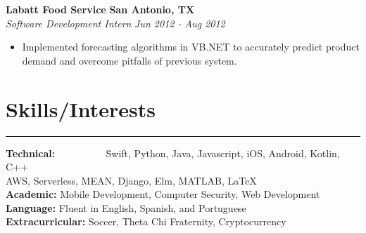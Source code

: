 \documentclass{res}
\begin{document}
\begin{resume}
{\bf Labatt Food Service} \hfill {\bf San Antonio, TX} \\
{\textit {Software Development Intern}} \hfill {\textit {Jun 2012 - Aug 2012}} 
\begin{itemize}
\renewcommand{\labelitemi}{\ding{117}}
\itemsep -2pt  
\item Implemented forecasting algorithms in VB.NET to accurately predict product demand
	and overcome pitfalls of previous system.
\end{itemize}

\vspace{-9pt}

\section{{\large Skills/Interests}}

\vspace{-10pt}

\noindent\rule{\resumewidth}{0.4pt}  
\vspace{-30pt}
\begin{tabbing}
{\bf Technical: } ~~~~~~~~~ \= Swift, Python, Java, Javascript, iOS, Android, Kotlin, C++ \\
\> AWS, Serverless, MEAN, Django, Elm, MATLAB, \LaTeX \\
{\bf Academic: } \>  Mobile Development, Computer Security, Web Development \\
{\bf Language: } \> Fluent in English, Spanish, and Portuguese\\
{\bf Extracurricular: } \> Soccer, Theta Chi Fraternity, Cryptocurrency \\
\end{tabbing}

\end{resume} 
\end{document}

